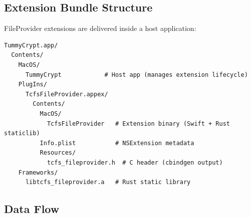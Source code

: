 \documentclass[11pt,a4paper]{article}
\begin{document}
\subsection{Extension Bundle Structure}

FileProvider extensions are delivered inside a host application:

\begin{lstlisting}[language={}]
TummyCrypt.app/
  Contents/
    MacOS/
      TummyCrypt            # Host app (manages extension lifecycle)
    PlugIns/
      TcfsFileProvider.appex/
        Contents/
          MacOS/
            TcfsFileProvider   # Extension binary (Swift + Rust staticlib)
          Info.plist           # NSExtension metadata
          Resources/
            tcfs_fileprovider.h  # C header (cbindgen output)
    Frameworks/
      libtcfs_fileprovider.a   # Rust static library
\end{lstlisting}

\subsection{Data Flow}
\end{document}
